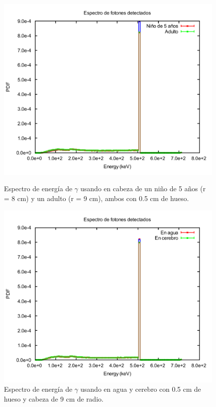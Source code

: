 \documentclass[12pt,a4paper,onecolumn]{article}
\begin{document}
\begin{figure}[H]
	\centering
	\begin{minipage}{0.45\textwidth}
		\centering
		\includegraphics[scale=0.32]{2_nino5_vs_adulto}
		\caption{Espectro de energía de $\gamma$ usando  en cabeza de un niño de 5 años (r = 8 cm) y un adulto (r = 9 cm), ambos con 0.5 cm de hueso.} 
		\label{fig:2nino5vsadult}
	\end{minipage}
	\hspace{2mm}
	\begin{minipage}{0.45\textwidth}
		\centering
		\includegraphics[scale=0.32]{2brainvswater}
		\caption{Espectro de energía de $\gamma$ usando  en agua y cerebro con 0.5 cm de hueso y cabeza de 9 cm de radio.}
		\label{fig:2brainvswater}  
	\end{minipage}	
\end{figure}
\end{document}
